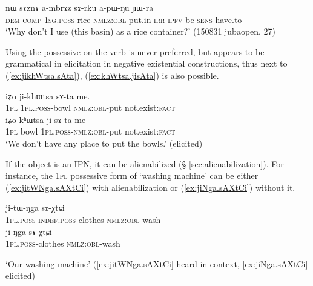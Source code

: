 \begin{exe}
\ex \label{ex:ambrAz.sArku}
\gll  nɯ sɤznɤ a-mbrɤz sɤ-rku a-pɯ-ŋu ɲɯ-ra \\
\textsc{dem} \textsc{comp} \textsc{1sg}.\textsc{poss}-rice \textsc{nmlz}:\textsc{obl}-put.in \textsc{irr}-\textsc{ipfv}-be \textsc{sens}-have.to \\
\glt  `Why don't I use (this basin) as a rice container?' (150831 jubaopen, 27)
\end{exe} 

Using the possessive on the verb is never preferred, but appears to be grammatical in elicitation in negative existential constructions, thus next to (\ref{ex:jikhWtsa.sAta}),  (\ref{ex:khWtsa.jisAta}) is also possible.
\begin{exe}
\ex
\begin{xlist}
\ex \label{ex:jikhWtsa.sAta}
\gll iʑo ji-khɯtsa sɤ-ta me. \\
\textsc{1pl} \textsc{1pl}.\textsc{poss}-bowl  \textsc{nmlz}:\textsc{obl}-put not.exist:\textsc{fact} \\ 
\ex \label{ex:khWtsa.jisAta}
\gll iʑo kʰɯtsa ji-sɤ-ta me  \\
\textsc{1pl} bowl \textsc{1pl}.\textsc{poss}-\textsc{nmlz}:\textsc{obl}-put not.exist:\textsc{fact} \\ 
\glt `We  don't have any place to put the bowls.' (elicited)
\end{xlist}
\end{exe} 


If the object is an IPN, it can be alienabilized (§ \ref{sec:alienabilization}). For instance, the \textsc{1pl} possessive form of  `washing machine' can be either (\ref{ex:jitWNga.sAXtCi}) with alienabilization or (\ref{ex:jiNga.sAXtCi}) without it.

\begin{exe}
\ex
\begin{xlist}
\ex \label{ex:jitWNga.sAXtCi}
\gll ji-tɯ-ŋga sɤ-χtɕi \\
\textsc{1pl}.\textsc{poss}-\textsc{indef}.\textsc{poss}-clothes \textsc{nmlz}:\textsc{obl}-wash \\
\ex \label{ex:jiNga.sAXtCi}
\gll ji-ŋga sɤ-χtɕi \\
\textsc{1pl}.\textsc{poss}-clothes \textsc{nmlz}:\textsc{obl}-wash \\
\end{xlist}
\glt `Our washing machine' (\ref{ex:jitWNga.sAXtCi} heard in context, \ref{ex:jiNga.sAXtCi} elicited)
\end{exe}

